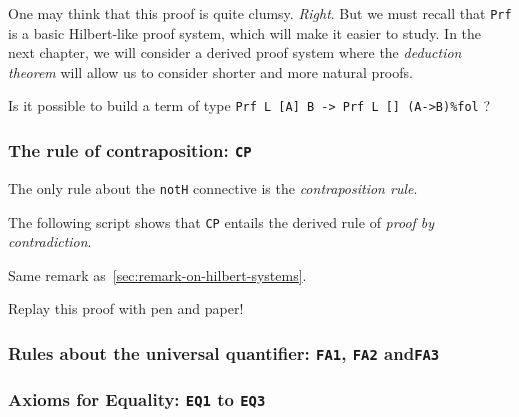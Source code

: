 \begin{remark}
\label{sec:remark-on-hilbert-systems}
One may think that this proof 
is quite clumsy. \emph{Right}.
But we must recall that \texttt{Prf} is a basic Hilbert-like
proof system, which will make it easier to study.
In the next chapter, we will consider a derived proof system 
where the \emph{deduction theorem} will allow us to consider shorter and more natural proofs.
\end{remark}

\begin{exercise}[**]
  Is it possible to build a term of type
\texttt{Prf L [A] B -> Prf L [] (A->B)\%fol} ?
\end{exercise}

\subsubsection{The rule of contraposition: \texttt{CP}}

The only rule about the \texttt{notH} connective is
the \emph{contraposition rule}.



The following script shows that \texttt{CP} entails the 
derived rule of \emph{proof by contradiction}.

\label{prfex4}


\begin{remark}
Same remark as~\ref{sec:remark-on-hilbert-systems}.
\end{remark}

\begin{exercise}
  Replay this proof with pen and paper!
\end{exercise}


\subsubsection{Rules about the universal quantifier: \texttt{FA1},
\texttt{FA2} and\texttt{FA3}}






\subsubsection{Axioms for Equality: \texttt{EQ1} to \texttt{EQ3}}



